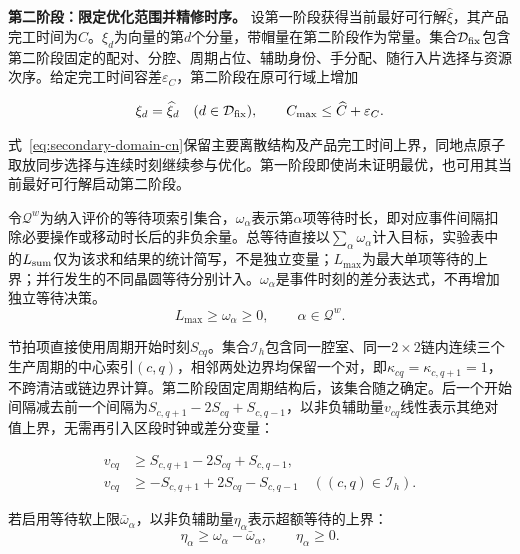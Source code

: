\documentclass[final,5p,times,twocolumn]{elsarticle}
\begin{document}
\noindent\textbf{第二阶段：限定优化范围并精修时序。}
设第一阶段获得当前最好可行解$\widehat\xi$，其产品完工时间为$\widehat C$。$\xi_d$为向量的第$d$个分量，带帽量在第二阶段作为常量。集合$\mathcal D_{\rm fix}$包含第二阶段固定的配对、分腔、周期占位、辅助身份、手分配、随行入片选择与资源次序。给定完工时间容差$\varepsilon_C$，第二阶段在原可行域上增加

\begin{equation}
\begin{gathered}
\xi_d=\widehat\xi_d\quad(d\in\mathcal D_{\rm fix}),\qquad
C_{\max}\le\widehat C+\varepsilon_C.
\end{gathered}
\label{eq:secondary-domain-cn}
\end{equation}

式~\eqref{eq:secondary-domain-cn}保留主要离散结构及产品完工时间上界，同地点原子取放同步选择与连续时刻继续参与优化。第一阶段即使尚未证明最优，也可用其当前最好可行解启动第二阶段。

令$\mathcal Q^w$为纳入评价的等待项索引集合，$\omega_\alpha$表示第$\alpha$项等待时长，即对应事件间隔扣除必要操作或移动时长后的非负余量。总等待直接以$\sum_\alpha\omega_\alpha$计入目标，实验表中的$L_{\rm sum}$仅为该求和结果的统计简写，不是独立变量；$L_{\max}$为最大单项等待的上界；并行发生的不同晶圆等待分别计入。$\omega_\alpha$是事件时刻的差分表达式，不再增加独立等待决策。
\begin{equation}
L_{\max}\ge\omega_\alpha\ge0,\qquad \alpha\in\mathcal Q^w.
\label{eq:secondary-wait-cn}
\end{equation}

节拍项直接使用周期开始时刻$S_{cq}$。集合$\mathcal I_h$包含同一腔室、同一$2\times2$链内连续三个生产周期的中心索引$(c,q)$，相邻两处边界均保留一个对，即$\kappa_{cq}=\kappa_{c,q+1}=1$，不跨清洁或链边界计算。第二阶段固定周期结构后，该集合随之确定。后一个开始间隔减去前一个间隔为$S_{c,q+1}-2S_{cq}+S_{c,q-1}$，以非负辅助量$v_{cq}$线性表示其绝对值上界，无需再引入区段时钟或差分变量：

\begin{equation}
\begin{aligned}
v_{cq}&\ge S_{c,q+1}-2S_{cq}+S_{c,q-1},\\
v_{cq}&\ge-S_{c,q+1}+2S_{cq}-S_{c,q-1}
\quad((c,q)\in\mathcal I_h).
\end{aligned}
\label{eq:secondary-rhythm-cn}
\end{equation}

若启用等待软上限$\bar\omega_\alpha$，以非负辅助量$\eta_\alpha$表示超额等待的上界：
\begin{equation}
\eta_\alpha\ge\omega_\alpha-\bar\omega_\alpha,\qquad
\eta_\alpha\ge0.
\label{eq:secondary-softwait-cn}
\end{equation}
\end{document}
